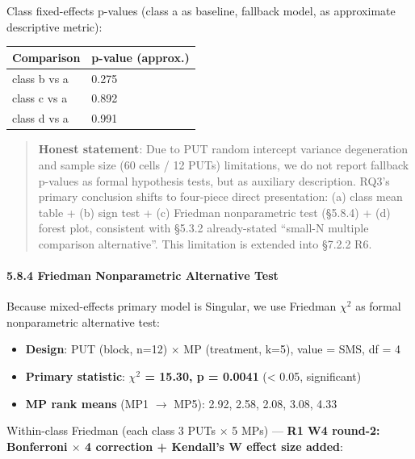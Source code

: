 \documentclass[review,12pt,authoryear]{elsarticle}
\providecommand{\tightlist}{\setlength{\itemsep}{0pt}\setlength{\parskip}{0pt}}
\begin{document}
Class fixed-effects p-values (class a as baseline, fallback model, as
approximate descriptive metric):

{\def\LTcaptype{none} %
\begin{longtable}[]{@{}ll@{}}
\toprule\noalign{}
Comparison & p-value (approx.) \\
\midrule\noalign{}
\endhead
\bottomrule\noalign{}
\endlastfoot
class b vs a & 0.275 \\
class c vs a & 0.892 \\
class d vs a & 0.991 \\
\end{longtable}
}

\begin{quote}
\textbf{Honest statement}: Due to PUT random intercept variance
degeneration and sample size (60 cells / 12 PUTs) limitations, we do not
report fallback p-values as formal hypothesis tests, but as auxiliary
description. RQ3's primary conclusion shifts to four-piece direct
presentation: (a) class mean table + (b) sign test + (c) Friedman
nonparametric test (§5.8.4) + (d) forest plot, consistent with §5.3.2
already-stated ``small-N multiple comparison alternative''. This
limitation is extended into §7.2.2 R6.
\end{quote}

\paragraph{5.8.4 Friedman Nonparametric Alternative
Test}\label{friedman-nonparametric-alternative-test}

Because mixed-effects primary model is Singular, we use Friedman $\chi$$^{2}$ as
formal nonparametric alternative test:

\begin{itemize}
\tightlist
\item
  \textbf{Design}: PUT (block, n=12) $\times$ MP (treatment, k=5), value = SMS,
  df = 4
\item
  \textbf{Primary statistic}: \textbf{$\chi$$^{2}$ = 15.30, p = 0.0041}
  (\textless{} 0.05, significant)
\item
  \textbf{MP rank means} (MP1 $\to$ MP5): 2.92, 2.58, 2.08, 3.08, 4.33
\end{itemize}

Within-class Friedman (each class 3 PUTs $\times$ 5 MPs) --- \textbf{R1 W4
round-2: Bonferroni $\times$ 4 correction + Kendall's W effect size added}:
\end{document}
